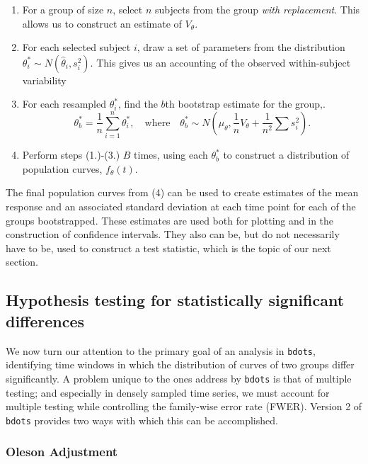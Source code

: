 \documentclass{article}
\newcommand{\xt}{\texttt}%
\begin{document}
\begin{singlespace}
\begin{enumerate}
\vspace{-3mm}
\item For a group of size $n$, select $n$ subjects from the group \textit{with replacement}. This allows us to construct an estimate of $V_{\theta}$.
\item For each selected subject $i$, draw a set of parameters from the distribution $\theta_{i}^* \sim N(\hat{\theta}_i, s_i^2)$. This gives us an accounting of the observed within-subject variability
\item For each resampled $\theta_i^*$, find the $b$th bootstrap estimate for the group,.
\begin{equation}
\theta_b^* = \frac1n \sum_{i=1}^n \theta_i^*, \quad \text{where} \quad \theta_b^* \sim N  \left(\mu_{\theta}, \frac1n V_{\theta} + \frac{1}{n^2}\sum s_i^2 \right).
\end{equation}
\item Perform steps (1.)-(3.) $B$ times, using each $\theta_b^*$ to construct a distribution of population curves, $f_{\theta}(t)$.
\end{enumerate}
\end{singlespace}

The final population curves from (4) can be used to create estimates of the mean response and an associated standard deviation at each time point for each of the groups bootstrapped. These estimates are used both for plotting and in the construction of confidence intervals. They also can be, but do not necessarily have to be, used to construct a test statistic, which is the topic of our next section.

\subsection{Hypothesis testing for statistically significant differences}

We now turn our attention to the primary goal of an analysis in \xt{bdots}, identifying time windows in which the distribution of curves of two groups differ significantly. A problem unique to the ones address by \xt{bdots} is that of multiple testing; and especially in densely sampled time series, we must account for multiple testing while controlling the family-wise error rate (FWER). Version 2 of \xt{bdots} provides two ways with which this can be accomplished.

\subsubsection{Oleson Adjustment}
\end{document}
